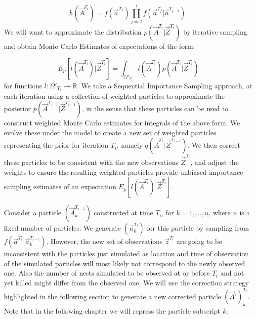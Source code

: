 {\begin{equation*}
    h(\vec{A}^{T_i}) = f(\vec{a}^{T_1}) \prod_{j=2}^{i} f(\vec{a}^{T_j} | \vec{a}^{T_{j-1}}).
\end{equation*}
We will want to approximate the distribution $p(\vec{A}^{T_i} | \vec{Z}^{T_i})$ by iterative sampling and obtain Monte Carlo Estimates of expectations of the form:

\begin{equation*}
    E_p[l(\vec{A}^{T_i}) | \vec{Z}^{T_i}] = \int_{\Omega'_{T_i}} l(\vec{A}^{T_i}) p(\vec{A}^{T_i} | \vec{Z}^{T_i})
\end{equation*}
for functions $l : \Omega'_{T_i} \rightarrow \mathbb{R}$.
We take a Sequential Importance Sampling approach, at each iteration using a collection of weighted particles to approximate the posterior $p(\vec{A}^{T_{i-1}} | \vec{Z}^{T_{i-1}})$, in the sense that these particles can be used to construct weighted Monte Carlo estimates for integrals of the above form. We evolve these under the model to create a new set of weighted particles representing the prior for iteration $T_i$, namely $q(\vec{A}^{T_i} | \vec{Z}^{T_{i-1}})$. We then correct these particles to be consistent with the new observations $\vec{Z}^{T_i}$, and adjust the weights to ensure the resulting weighted particles provide unbiased importance sampling estimates of an expectation $E_p[l(\vec{A}^{T_i}) | \vec{Z}^{T_i}]$.

Consider a particle $(\vec{A}_k^{T_{i-1}})$ constructed at time $T_i$, for $k = 1, \dots, n$, where $n$ is a fixed number of particles. We generate $(\vec{a}^{T_{i}}_k)$ for this particle by sampling from $f(\vec{a}^{T_i} | \vec{a}_k^{T_{i-1}})$. However, the new set of observations $\vec{z}^{T_i}$ are going to be inconsistent with the particles just simulated as location and time of observation of the simulated particles will most likely not correspond to the newly observed one. Also the number of nests simulated to be observed at or before $T_i$ and not yet killed might differ from the observed one. We will use the correction strategy highlighted in the following section to generate a new corrected particle $(\vec{A}')^{T_i}_k$. Note that in the following chapter we will repress the particle subscript $k$.

}

